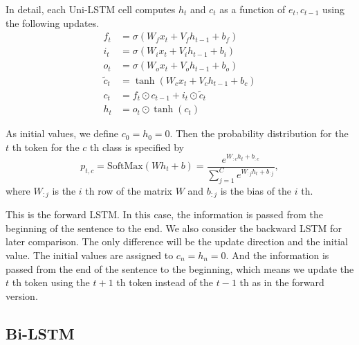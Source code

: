 \documentclass{article}
\begin{document}
In detail, each Uni-LSTM cell computes $h_t$ and $c_t$ as a function of $e_t, c_{t-1}$ using the following updates. 
\begin{align} 
f_t & = \sigma(W_f x_t + V_f h_{t - 1} + b_f) \label{eq:1f}\\
i_t & = \sigma(W_i x_t + V_i h_{t - 1} + b_i) \label{eq:1i}\\
o_t & = \sigma(W_o x_t + V_o h_{t - 1} + b_o) \label{eq:1o}\\
\tilde{c}_t & = \tanh(W_c x_t + V_c h_{t - 1} + b_c) \\
c_t & = f_t \odot c_{t - 1} + i_t \odot \tilde{c}_t \label{eq:1c}\\
h_t & = o_t \odot \tanh(c_t)\label{eq:1h}
\end{align}

As initial values, we define $c_0=h_0=0$. 
Then the probability distribution for the $t$ th token for the $c$ th class is specified by 
\begin{equation}
p_{t, c} = \text{SoftMax}(W h_t + b) = \frac{e^{W_{:c} h_t + b_{:c}}}{\sum_{j = 1} ^ C e^{W_{:j} h_t + b_{:j}}},
\end{equation}
where $W_{:j}$ is the $i$ th row of the matrix $W$ and $b_{:j}$ is the bias of the $i$ th.

This is the forward LSTM. In this case, the information is passed from the beginning of the sentence to the end. We also consider the backward LSTM for later comparison. The only difference will be the update direction and the initial value. The initial values are assigned to $c_n=h_n=0$. And the information is passed from the end of the sentence to the beginning, which means we update the $t$ th token using the $t+1$ th token instead of the $t-1$ th as in the forward version.


\subsection{Bi-LSTM}
\end{document}
